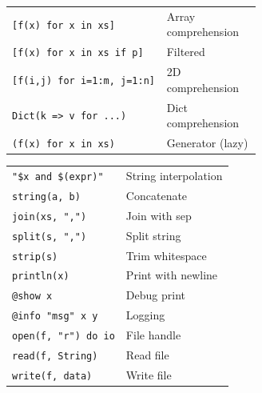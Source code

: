 \documentclass[10pt]{extarticle}
\begin{document}
\begin{multicols}{2}
\begin{tabularx}{\linewidth}{@{}>{\raggedright\arraybackslash}p{0.62\linewidth}@{\enspace}Y@{}}
\texttt{[f(x) for x in xs]}         & Array comprehension \\
\texttt{[f(x) for x in xs if p]}   & Filtered \\
\texttt{[f(i,j) for i=1:m, j=1:n]} & 2D comprehension \\
\texttt{Dict(k => v for ...)}       & Dict comprehension \\
\texttt{(f(x) for x in xs)}         & Generator (lazy) \\
\end{tabularx}

\begin{tabularx}{\linewidth}{@{}l@{\enspace}Y@{}}
\texttt{"\$x and \$(expr)"}         & String interpolation \\
\texttt{string(a, b)}               & Concatenate \\
\texttt{join(xs, ",")}              & Join with sep \\
\texttt{split(s, ",")}              & Split string \\
\texttt{strip(s)}                    & Trim whitespace \\
\texttt{println(x)}                 & Print with newline \\
\texttt{@show x}                    & Debug print \\
\texttt{@info "msg" x y}           & Logging \\
\texttt{open(f, "r") do io}        & File handle \\
\texttt{read(f, String)}           & Read file \\
\texttt{write(f, data)}            & Write file \\
\end{tabularx}


\end{multicols}
\end{document}
